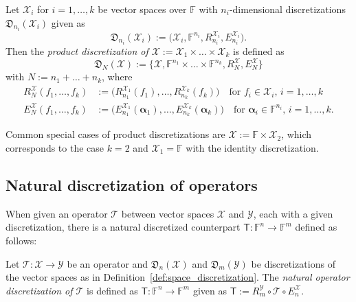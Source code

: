 \documentclass[a4paper]{paper}
\newcommand{\Discr}{\mathfrak{D}}
\newcommand{\VecSpace}[1]{\mathscr{#1}}
\newcommand{\Field}{\mathbb{F}}
\newcommand{\Op}[1]{\mathcal{#1}}
\newcommand{\DiscOp}[1]{\mathsf{#1}}
\newcommand*{\EXT}[2]{\ensuremath{E_{#1}^{#2}}}
\newcommand*{\REST}[2]{\ensuremath{R_{#1}^{#2}}}
\newcommand*{\RmY}{\ensuremath{\REST{m}{\VecSpace{Y}}}}
\newcommand*{\EnX}{\ensuremath{\EXT{n}{\VecSpace{X}}}}
\newcommand{\valpha}{\boldsymbol{\alpha}}
\begin{document}
\begin{definition}
 \label{def:product_space_discretization}
 Let $\VecSpace{X}_i$ for $i=1,\ldots,k$ be vector spaces over $\Field$ with $n_i$-dimensional discretizations 
 $\Discr_{n_i}(\VecSpace{X}_i)$ given as
 \begin{equation*}
  \Discr_{n_i}(\VecSpace{X}_i) := \bigl( \VecSpace{X}_i, \Field^{n_i}, \REST{n_i}{\VecSpace{X}_i}, \EXT{n_i}{\VecSpace{X}_i} \bigr). 
 \end{equation*}
 Then the \emph{product discretization of $\VecSpace{X} := \VecSpace{X}_1 \times \ldots \times \VecSpace{X}_k$} is defined as 
 \begin{equation*}
  \Discr_{N}(\VecSpace{X}):=\{\VecSpace{X}, \Field^{n_1} \times \ldots \times \Field^{n_k}, R_{N}^{\VecSpace{X}}, E_{N}^{\VecSpace{X}} \}
 \end{equation*}
 with $N := n_1 + \ldots + n_k$, where
 \begin{align*}
  \REST{N}{\VecSpace{X}}(f_1,\ldots,f_k) &:= \bigl( \REST{n_1}{\VecSpace{X}_1}(f_1),\ldots,\REST{n_k}{\VecSpace{X}_k}(f_k) \bigr)
   \quad\text{for $f_i\in \VecSpace{X}_i$, $i=1,\ldots,k$} \\
  \EXT{N}{\VecSpace{X}}(f_1,\ldots,f_k) &:= \bigl( \EXT{n_1}{\VecSpace{X}_1}(\valpha_1),\ldots,\EXT{n_k}{\VecSpace{X}_k}(\valpha_k) \bigr)
   \quad\text{for $\valpha_i\in \Field^{n_i}$, $i=1,\ldots,k$.}
 \end{align*}
\end{definition}

%
Common special cases of product discretizations are $\VecSpace{X}:=\Field \times \VecSpace{X}_2$, which corresponds to the case $k=2$ and 
$\VecSpace{X}_1=\Field$ with the identity discretization.


\subsection{Natural discretization of operators}

When given an operator $\Op{T}$ between vector spaces $\VecSpace{X}$ and $\VecSpace{Y}$, each with a given discretization, 
there is a natural discretized counterpart $\DiscOp{T} \colon \Field^n \to \Field^m$ defined as follows:

\begin{definition}
 \label{def:operator_discretization}
 Let $\Op{T}\colon \VecSpace{X} \to \VecSpace{Y}$ be an operator and $\Discr_n(\VecSpace{X})$ and $\Discr_m(\VecSpace{Y})$ be 
 discretizations of the vector spaces as in Definition~\ref{def:space_discretization}. The \emph{natural operator discretization 
 of $\Op{T}$} is defined as $\DiscOp{T} \colon \Field^n \to \Field^m$ given as $\DiscOp{T} := \RmY \circ \Op{T} \circ \EnX$.
\end{definition}
\end{document}
